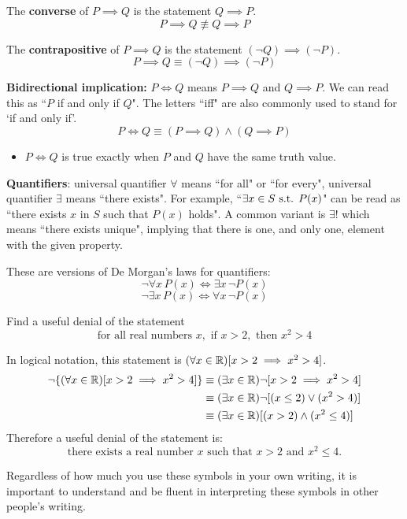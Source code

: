 The \textbf{converse} of $P \implies Q$ is the statement $Q \implies P$.
\[ P \implies Q \not\equiv Q \implies P \]

The \textbf{contrapositive} of $P \implies Q$ is the statement $(\lnot Q) \implies (\lnot P)$.
\[ P \implies Q \equiv (\lnot Q) \implies (\lnot P) \]

\textbf{Bidirectional implication:} $P \iff Q$ means $P \implies Q$ and $Q \implies P$. We can read this as ``$P$ if and only if $Q$". The letters ``iff" are also commonly used to stand for ‘if and only if’.
\[ P \iff Q \equiv (P \implies Q) \land (Q \implies P) \]

\begin{itemize}
\item $P \iff Q$ is true exactly when $P$ and $Q$ have the same truth value.
\end{itemize}

\textbf{Quantifiers}: universal quantifier $\forall$ means ``for all" or ``for every", universal quantifier $\exists$ means ``there exists". For example, ``$\exists x \in S \text{ s.t. } P(x)$" can be read as ``there exists $x$ in $S$ such that $P(x)$ holds". A common variant is $\exists!$ which means ``there exists unique", implying that there is one, and only one, element with the given property.

These are versions of De Morgan's laws for quantifiers:
\[ \lnot \forall x\,P(x) \iff \exists x\,\lnot P(x) \]
\[ \lnot \exists x\,P(x) \iff \forall x\,\lnot P(x) \]

\begin{exmp}{}{}
Find a useful denial of the statement
\[ \text{for all real numbers } x, \text{ if } x>2, \text{ then } x^2>4 \]
\end{exmp}
\begin{solution}
In logical notation, this statement is $(\forall x \in \mathbb R)[x>2 \implies x^2>4]$.
\begin{align*}
\lnot\{(\forall x \in \mathbb R)[x>2 \implies x^2>4]\} 
&\equiv (\exists x \in \mathbb R) \lnot[x>2 \implies x^2>4] \\
&\equiv (\exists x \in \mathbb R) \lnot [(x\le2) \lor (x^2>4)] \\
&\equiv (\exists x \in \mathbb R) [(x>2) \land (x^2\le4)]
\end{align*}
Therefore a useful denial of the statement is:
\[ \text{there exists a real number } x \text{ such that } x>2 \text{ and } x^2\le4. \] 
\end{solution}

\begin{remark}
Regardless of how much you use these symbols in your own writing, it is important to understand and be fluent in interpreting these symbols in other people's writing.
\end{remark}
\pagebreak

